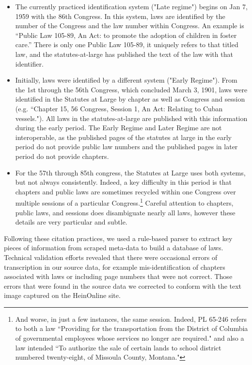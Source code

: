 \documentclass[fleqn,10pt]{wlscirep}
\begin{document}
\begin{itemize}
\item The currently practiced identification system ("Late regime") begins on Jan 7, 1959 with the 86th Congress. In this system, laws are identified by the number of the Congress and the law number within Congress. An example is ``Public Law 105-89, An Act: to promote the adoption of children in foster care.'' There is only one Public Law 105-89, it uniquely refers to that titled law, and the statutes-at-large has published the text of the law with that identifier.
\item Initially, laws were identified by a different system ("Early Regime"). From the 1st through the 56th Congress, which concluded March 3, 1901, laws were identified in the Statutes at Large by chapter as well as Congress and session (e.g. ``Chapter 15, 56 Congress, Session 1, An Act: Relating to Cuban vessels."). All laws in the statutes-at-large are published with this information during the early period. The Early Regime and Later Regime are not interoperable, as the published pages of the statutes at large in the early period do not provide public law numbers and the published pages in later period do not provide chapters.
\item For the 57th through 85th congress, the Statutes at Large uses both systems, but not always consistently. Indeed, a key difficulty in this period is that chapters and public laws are sometimes recycled within one Congress over multiple sessions of a particular Congress.\footnote{And worse, in just a few instances, the same session. Indeed, PL 65-246 refers to both a law ``Providing for the transportation from the District of Columbia of governmental employees whose services no longer are required." and also a law intended ``To authorize the sale of certain lands to school district numbered twenty-eight, of Missoula County, Montana."} Careful attention to chapters, public laws, and sessions does disambiguate nearly all laws, however these details are very particular and subtle. 
\end{itemize}

 Following these citation practices, we used a rule-based parser to extract key pieces of information from scraped meta-data to build a database of laws. Technical validation efforts revealed that there were occasional errors of transcription in our source data, for example mis-identification of chapters associated with laws or including page numbers that were not correct. Those errors that were found in the source data we corrected to conform with the text image captured on the HeinOnline site. 
\end{document}
